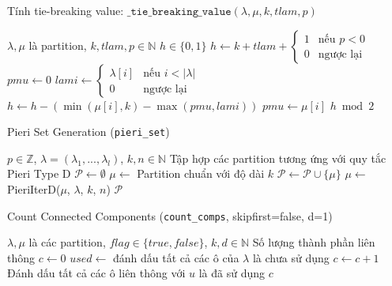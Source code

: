 \begin{algorithm}[H]
\caption{Tính tie-breaking value: $\mathtt{\_tie\_breaking\_value}(\lambda, \mu, k, tlam, p)$}
\begin{algorithmic}[1]
\REQUIRE $\lambda, \mu$ là partition, $k, tlam, p \in \mathbb{N}$
\ENSURE $h \in \{0,1\}$
\STATE $h \gets k + tlam + \begin{cases}
    1 & \text{nếu } p < 0 \\
    0 & \text{ngược lại}
\end{cases}$
\STATE $pmu \gets 0$
    \STATE $lami \gets \begin{cases}
        \lambda[i] & \text{nếu } i < |\lambda| \\
        0 & \text{ngược lại}
    \end{cases}$
        \STATE $h \gets h - (\min(\mu[i], k) - \max(pmu, lami))$
    \ENDIF
    \STATE $pmu \gets \mu[i]$
\ENDFOR
\RETURN $h \bmod 2$
\end{algorithmic}
\end{algorithm}

\begin{algorithm}[H]
\caption{Pieri Set Generation (\texttt{pieri\_set})}
\begin{algorithmic}[1]
\REQUIRE $p \in \mathbb{Z}$, $\lambda = (\lambda_1, ..., \lambda_l)$, $k, n \in \mathbb{N}$
\ENSURE Tập hợp các partition tương ứng với quy tắc Pieri Type D
\STATE $\mathcal{P} \gets \emptyset$
\STATE $\mu \gets$ Partition chuẩn với độ dài $k$
\WHILE{$\mu \neq \emptyset$}
    \STATE $\mathcal{P} \gets \mathcal{P} \cup \{\mu\}$
    \STATE $\mu \gets$ PieriIterD($\mu$, $\lambda$, $k$, $n$)
\ENDWHILE
\RETURN $\mathcal{P}$
\end{algorithmic}
\end{algorithm}

\begin{algorithm}[H]
\caption{Count Connected Components (\texttt{count\_comps}, skipfirst=false, d=1)}
\begin{algorithmic}[1]
\REQUIRE $\lambda, \mu$ là các partition, $flag \in \{true, false\}$, $k, d \in \mathbb{N}$
\ENSURE Số lượng thành phần liên thông
\STATE $c \gets 0$
\STATE $used \gets$ đánh dấu tất cả các ô của $\lambda$ là chưa sử dụng
        \STATE $c \gets c + 1$
        \STATE Đánh dấu tất cả các ô liên thông với $u$ là đã sử dụng
    \ENDIF
\ENDFOR
\RETURN $c$
\end{algorithmic}
\end{algorithm}


